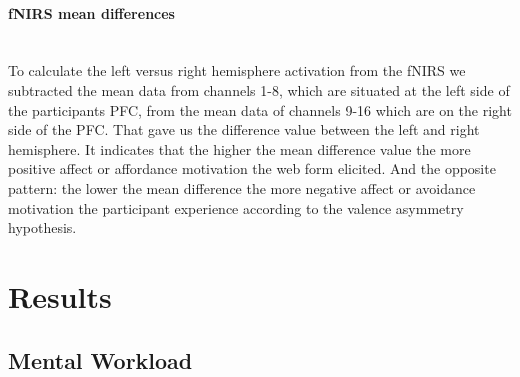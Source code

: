 \documentclass[a4paper]{report}
\begin{document}
				\paragraph{fNIRS mean differences}\leavevmode\\
				To calculate the left versus right hemisphere activation from the fNIRS we subtracted the mean data from channels 1-8, which are situated at the left side of the participants PFC, from the mean data of channels 9-16 which are on the right side of the PFC. That gave us the difference value between the left and right hemisphere. It indicates that the higher the mean difference value the more positive affect or affordance motivation the web form elicited. And the opposite pattern: the lower the mean difference the more negative affect or avoidance motivation the participant experience according to the valence asymmetry hypothesis.	
	\section{Results}
		\subsection{Mental Workload}
\end{document}
